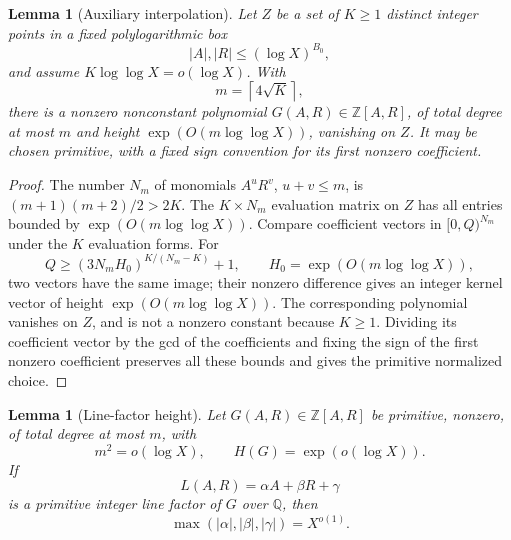 \documentclass[11pt]{article}
\newtheorem{lemma}[theorem]{Lemma}
\theoremstyle{definition}
\newcommand{\Z}{\mathbb Z}
\newcommand{\Q}{\mathbb Q}
\newcommand{\ceil}[1]{\left\lceil #1\right\rceil}
\newcommand{\abs}[1]{\left|#1\right|}
\newcommand{\1}{\mathbf 1}
\begin{document}
\begin{lemma}[Auxiliary interpolation]\label{lem:interpolation}
Let \(Z\) be a set of \(K\ge1\) distinct integer points in a fixed
polylogarithmic box
\[
  \abs{A},\abs{R}\le(\log X)^{B_0},
\]
and assume \(K\log\log X=o(\log X)\).  With
\[
  m=\ceil{4\sqrt K},
\]
there is a nonzero nonconstant polynomial \(G(A,R)\in\Z[A,R]\), of total
degree at most \(m\) and height \(\exp(O(m\log\log X))\), vanishing on \(Z\).
It may be chosen primitive, with a fixed sign convention for its first
nonzero coefficient.
\end{lemma}

\begin{proof}
The number \(N_m\) of monomials \(A^uR^v\), \(u+v\le m\), is
\((m+1)(m+2)/2>2K\).  The \(K\times N_m\) evaluation matrix on \(Z\) has all
entries bounded by \(\exp(O(m\log\log X))\).  Compare coefficient vectors in
\([0,Q)^{N_m}\) under the \(K\) evaluation forms.  For
\[
  Q\ge (3N_mH_0)^{K/(N_m-K)}+1,\qquad H_0=\exp(O(m\log\log X)),
\]
two vectors have the same image; their nonzero difference gives an integer
kernel vector of height \(\exp(O(m\log\log X))\).  The corresponding
polynomial vanishes on \(Z\), and is not a nonzero constant because \(K\ge1\).
Dividing its coefficient vector by the gcd of the coefficients and fixing the
sign of the first nonzero coefficient preserves all these bounds and gives the
primitive normalized choice.
\end{proof}

\begin{lemma}[Line-factor height]\label{lem:line-height}
Let \(G(A,R)\in\Z[A,R]\) be primitive, nonzero, of total degree at most \(m\),
with
\[
  m^2=o(\log X),\qquad H(G)=\exp(o(\log X)).
\]
If
\[
  L(A,R)=\alpha A+\beta R+\gamma
\]
is a primitive integer line factor of \(G\) over \(\Q\), then
\[
  \max(\abs{\alpha},\abs{\beta},\abs{\gamma})=X^{o(1)}.
\]
\end{lemma}
\end{document}
